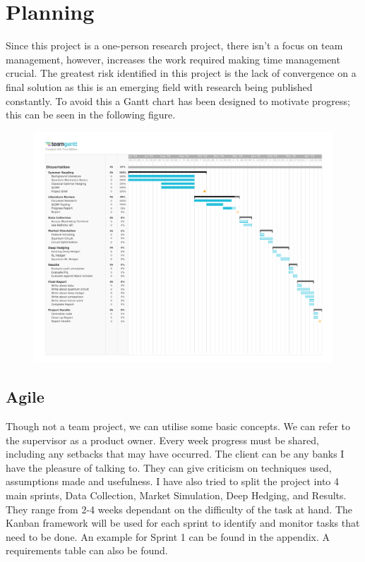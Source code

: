 \documentclass[12pt]{article}
\numberwithin{equation}{section}
\begin{document}
\clearpage 
\section{Planning}
Since this project is a one-person research project, there isn't a focus on team 
management, however, increases the work required making 
time management crucial. The greatest risk identified in this project is the 
lack of convergence on a final solution as this is an emerging field with research 
being published constantly. To avoid this a Gantt chart has been designed to 
motivate progress; this can be seen in the following figure.
\begin{figure}[htp]
\includegraphics[page=1,width=\textwidth,scale=1.4]{GanttChart.pdf}
\end{figure}

\subsection{Agile}
Though not a team project, we can utilise some basic concepts. We can refer to 
the supervisor as a product owner. Every week progress must be shared, including 
any setbacks that may have occurred. The client can be any banks I have the 
pleasure of talking to. They can give criticism on techniques used, assumptions 
made and usefulness. I have also tried to split the project into 4 main sprints,
Data Collection, Market Simulation, Deep Hedging, and Results. They range from 
2-4 weeks dependant on the difficulty of the task at hand. The Kanban framework 
will be used for each sprint to identify and monitor tasks that need to be done. 
An example for Sprint 1 can be found in the appendix. A requirements table can 
also be found.
\end{document}
